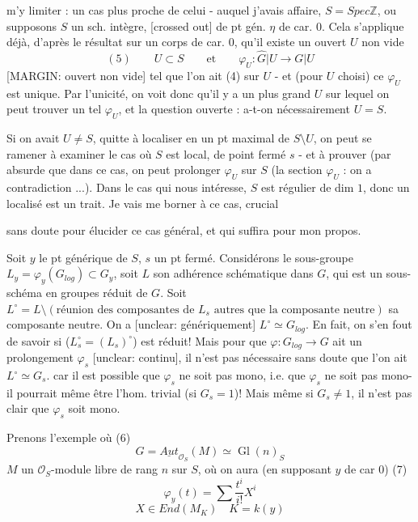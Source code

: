 \newpage


m'y limiter : un cas plus proche de celui
- auquel j'avais affaire, $S = Spec \mathbb{Z}$, ou supposons
$S$ un sch. intègre, [crossed out] de pt gén. $\eta$ de
car. $0$. Cela s'applique déjà, d'après le
résultat sur un corps de car. $0$, qu'il
existe un ouvert $U$ non vide
$$ (5) \qquad U \subset S \qquad \text{et} \qquad \varphi_U : \hat{G}|U \to G|U $$
[MARGIN: ouvert non vide]
tel que l'on ait (4) sur $U$ - et (pour
$U$ choisi) ce $\varphi_U$ est unique. Par l'unicité,
on voit donc qu'il y a un plus grand $U$
sur lequel on peut trouver un
tel $\varphi_U$, et la question ouverte : a-t-on
nécessairement $U = S$.

Si on avait $U \neq S$, quitte à localiser
en un pt maximal de $S \setminus U$, on peut se
ramener à examiner le cas où $S$ est local,
de point fermé $s$ - et à prouver (par
absurde que dans ce cas, on peut prolonger $\varphi_U$ sur $S$
(la section $\varphi_U$ : on a contradiction ...). Dans
le cas qui nous intéresse, $S$ est régulier de
dim $1$, donc un localisé est un
trait. Je vais me borner à ce cas, crucial

\newpage


sans doute pour élucider ce cas général,
et qui suffira pour mon propos.

Soit $y$ le pt générique de $S$, $s$ un pt fermé.
Considérons le sous-groupe $L_y = \varphi_y(G_{log}) \subset G_y$,
soit $L$ son adhérence schématique dans $G$,
qui est un sous-schéma en groupes réduit
de $G$. Soit $L^\circ = L \setminus (\text{réunion des composantes de } L_s \text{ autres que la composante neutre})$
sa composante neutre. On a [unclear: génériquement]
$L^\circ \simeq G_{log}$. En fait, on s'en
fout de savoir si ($L^\circ_s = (L_s)^\circ$) est réduit!
Mais pour que $\varphi : G_{log} \to G$ ait un
prolongement $\varphi_s$ [unclear: continu], il n'est pas nécessaire
sans doute que l'on ait $L^\circ \simeq G_s$.
car il est possible que $\varphi_s$ ne soit pas
mono, i.e. que $\varphi_s$ ne soit pas mono-
il pourrait même être l'hom. trivial (si $G_s = 1$)!
Mais même si $G_s \neq 1$, il n'est pas clair que
$\varphi_s$ soit mono.

Prenons l'exemple où
(6) $$G = \underline{Aut}_{\mathcal{O}_S}(M) \simeq \operatorname{Gl}(n)_S$$
$M$ un $\mathcal{O}_S$-module libre de rang $n$ sur $S$,
où on aura (en supposant $y$ de car 0)
(7) $$\varphi_y(t) = \sum \frac{t^i}{i!} X^i$$
$$X \in End(M_K) \quad K = k(y)$$

